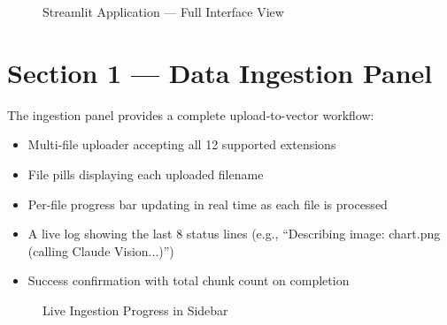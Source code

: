 \documentclass[12pt,a4paper]{report}
\begin{document}
\begin{figure}[H]
    \centering
    \caption{Streamlit Application --- Full Interface View}
    \label{fig:streamlit_full}
\end{figure}

\section{Section 1 --- Data Ingestion Panel}

The ingestion panel provides a complete upload-to-vector workflow:

\begin{itemize}[leftmargin=2cm]
    \item Multi-file uploader accepting all 12 supported extensions
    \item File pills displaying each uploaded filename
    \item Per-file progress bar updating in real time as each file is processed
    \item A live log showing the last 8 status lines (e.g., ``Describing image: chart.png (calling Claude Vision...)'')
    \item Success confirmation with total chunk count on completion
\end{itemize}

\begin{figure}[H]
    \centering
    \caption{Live Ingestion Progress in Sidebar}
    \label{fig:ingestion_progress}
\end{figure}
\end{document}

